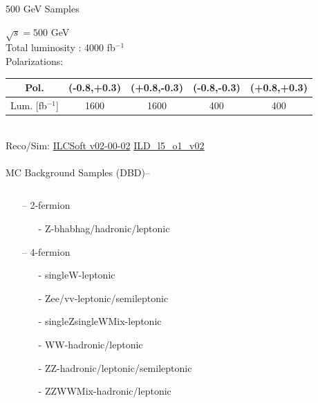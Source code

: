 \documentclass[10pt]{beamer}
\begin{document}
\begin{frame}{500 GeV Samples}

$\sqrt{s} = 500$ GeV\\
Total luminosity : 4000 fb$^{-1}$\\
Polarizations:
\scriptsize
\begin{tabular}{|c|c|c|c|c|}
\hline 
Pol. &(-0.8,+0.3) & (+0.8,-0.3) & (-0.8,-0.3) & (+0.8,+0.3) \\ 
\hline 
Lum. [fb$^{-1}$] & 1600 & 1600 & 400 & 400 \\ 
\hline 
\end{tabular} 
\normalsize
\quad \quad \\
Reco/Sim: \quad \scriptsize
\url{ILCSoft v02-00-02} \quad
\url{ILD_l5_o1_v02}\\
\quad \quad \\
\normalsize
MC Background Samples (DBD)--\\

\begin{columns}
\begin{column}{0.5\textwidth}

\begin{itemize}

	\item[--] 2-fermion 
		\begin{itemize}
			\scriptsize
			\item[-] Z-bhabhag/hadronic/leptonic
		\end{itemize}
	\item[--] 4-fermion 
		\begin{itemize}
			\scriptsize
			\item[-] singleW-leptonic 
			\item[-]Zee/vv-leptonic/semileptonic 
			\item[-]singleZsingleWMix-leptonic 
			\item[-]WW-hadronic/leptonic
			\item[-]ZZ-hadronic/leptonic/semileptonic
			\item[-]ZZWWMix-hadronic/leptonic
		\end{itemize}
	

\end{itemize}


\end{column}
\end{columns}
\end{frame}
\end{document}
